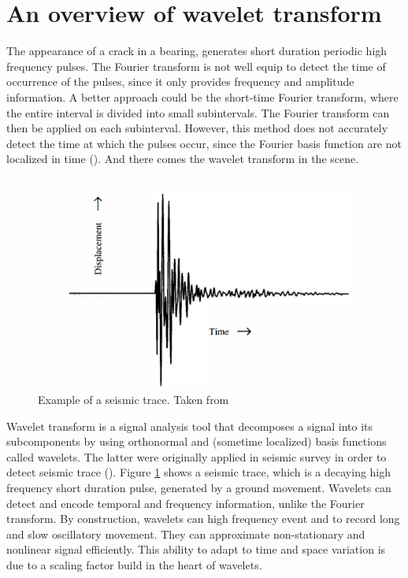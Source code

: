 \documentclass[../Main/thesis.tex]{subfiles}
\begin{document}
\section{An overview of wavelet transform}
\label{sec:wavelet}
The appearance of a crack in a bearing, generates short duration periodic high frequency pulses. The Fourier transform is not well equip to detect the time of occurrence of the pulses, since it only provides frequency and amplitude information. A better approach could be the short-time Fourier transform, where the entire interval is divided into small subintervals. The Fourier transform can then be applied on each subinterval. However, this method does not accurately detect the time at which the pulses occur, since the Fourier basis function are not localized in time (\cite{albert09}). And there comes the wavelet transform in the scene.  
\begin{figure}[H] %
   \centering
   \includegraphics[width=4.5in]{../fig/seismicwave.png} 
   \caption{Example of a seismic trace. Taken from \cite{albert09}}
   \label{fig:seismicwave}
\end{figure}
\justify
Wavelet transform is a signal analysis tool that decomposes a signal into its subcomponents by using orthonormal and (sometime localized) basis functions called wavelets. The latter were originally applied in seismic survey in order to detect seismic trace (\cite{albert09}). Figure \ref{fig:seismicwave} shows a seismic trace, which is a decaying high frequency short duration pulse, generated by a ground movement.
\justify
 Wavelets can detect and encode temporal and frequency information, unlike the Fourier transform. By construction, wavelets can  high frequency event and  to record long and slow oscillatory movement. They can approximate non-stationary and nonlinear signal efficiently. This ability to adapt to time and space variation is due to a scaling factor build in the heart of wavelets.
\end{document}

